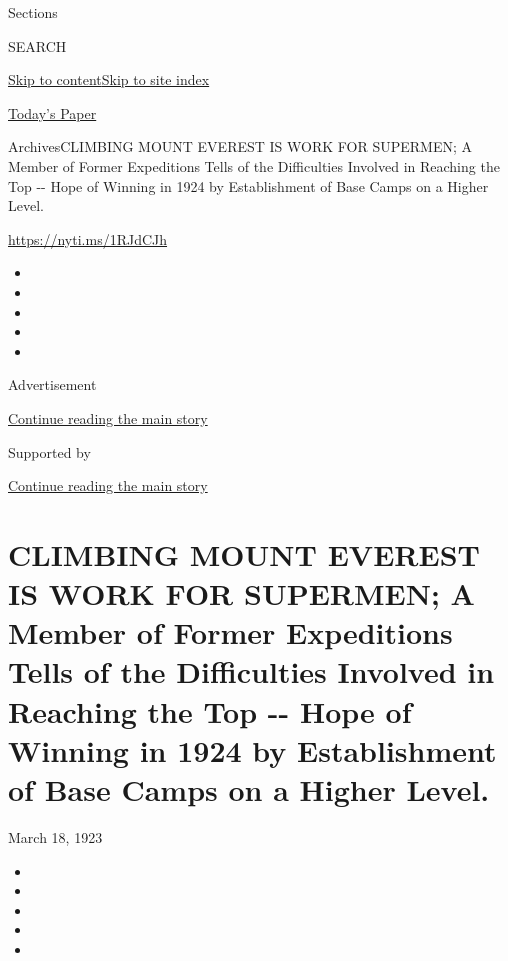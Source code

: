 Sections

SEARCH

\protect\hyperlink{site-content}{Skip to
content}\protect\hyperlink{site-index}{Skip to site index}

\href{https://myaccount.nytimes3xbfgragh.onion/auth/login?response_type=cookie\&client_id=vi}{}

\href{https://www.nytimes3xbfgragh.onion/section/todayspaper}{Today's
Paper}

Archives\textbar{}CLIMBING MOUNT EVEREST IS WORK FOR SUPERMEN; A Member
of Former Expeditions Tells of the Difficulties Involved in Reaching the
Top -\/- Hope of Winning in 1924 by Establishment of Base Camps on a
Higher Level.

\url{https://nyti.ms/1RJdCJh}

\begin{itemize}
\item
\item
\item
\item
\item
\end{itemize}

Advertisement

\protect\hyperlink{after-top}{Continue reading the main story}

Supported by

\protect\hyperlink{after-sponsor}{Continue reading the main story}

\hypertarget{climbing-mount-everest-is-work-for-supermen-a-member-of-former-expeditions-tells-of-the-difficulties-involved-in-reaching-the-top----hope-of-winning-in-1924-by-establishment-of-base-camps-on-a-higher-level}{%
\section{CLIMBING MOUNT EVEREST IS WORK FOR SUPERMEN; A Member of Former
Expeditions Tells of the Difficulties Involved in Reaching the Top -\/-
Hope of Winning in 1924 by Establishment of Base Camps on a Higher
Level.}\label{climbing-mount-everest-is-work-for-supermen-a-member-of-former-expeditions-tells-of-the-difficulties-involved-in-reaching-the-top----hope-of-winning-in-1924-by-establishment-of-base-camps-on-a-higher-level}}

March 18, 1923

\begin{itemize}
\item
\item
\item
\item
\item
\end{itemize}

